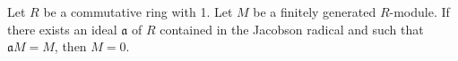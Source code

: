 \documentclass[12pt]{article}
\begin{document}
Let $R$ be a commutative ring with 1. Let $M$ be a finitely generated $R$-module. If there exists an ideal $\mathfrak{a}$ of $R$ contained in the Jacobson radical and such that $\mathfrak{a}M = M$, then $M=0$.
\end{document}
